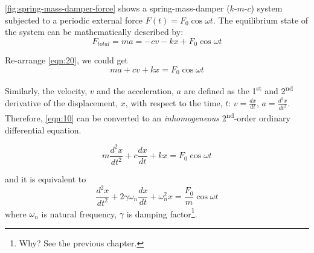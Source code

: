 \documentclass[12pt,a4paper]{article}
\begin{document}
\autoref{fig:spring-mass-damper-force} shows a spring-mass-damper ($k$-$m$-$c$) system subjected to a periodic external force $F(t) = F_0 \cos \omega t$. The equilibrium state of the system can be mathematically described by:
\begin{equation} \label{eqn:20}
    F_{total} = ma = -cv - kx + F_{0}\cos\omega t
\end{equation}

Re-arrange \autoref{eqn:20}, we could get
\begin{equation} \label{eqn:21}
    ma + cv + kx = F_{0}\cos\omega t
\end{equation}

Similarly, the velocity, $v$ and the acceleration, $a$ are defined as the 1\textsuperscript{st} and 2\textsuperscript{nd} derivative of the displacement, $x$, with respect to the time, $t$:  $\displaystyle v=\frac{dx}{dt}$, $\displaystyle a=\frac{d^{2}x}{dt^{2}}$. Therefore, \autoref{eqn:10} can be converted to an \textit{inhomogeneous} 2\textsuperscript{nd}-order ordinary differential equation. 

\begin{equation} \label{eqn:22}
    m\frac{d^{2}x}{dt^{2}} + c\frac{dx}{dt} + kx = F_{0}\cos\omega t
\end{equation}

and it is equivalent to 
\begin{equation} \label{eqn:23}
   \frac{d^{2}x}{dt^{2}} + 2\gamma \omega_{n}\frac{dx}{dt} + \omega_{n}^{2}x = \frac{F_{0}}{m}\cos\omega t
\end{equation}
where $\omega_{n}$ is natural frequency, $\gamma$ is damping factor\footnote{Why? See the previous chapter.}.
\end{document}
